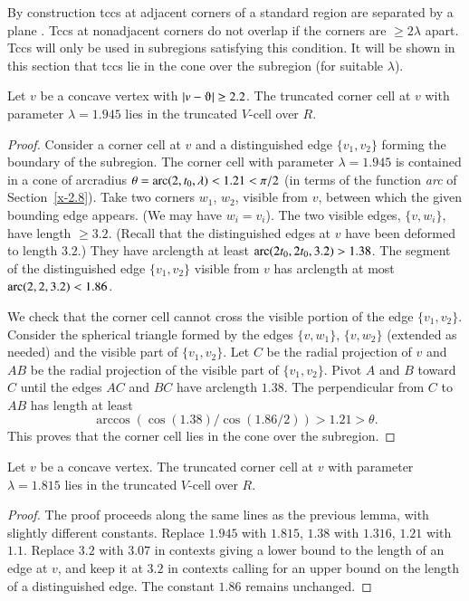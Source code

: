 By construction tccs at adjacent
corners of a standard region are separated by a plane . Tccs at
nonadjacent corners do not overlap if the corners are
$\ge2\lambda$ apart. Tccs will only be used in subregions
satisfying this condition. It will be shown in
this section that tccs lie in the cone over the subregion
(for suitable $\lambda$).

\begin{lemma}
Let $v$ be a concave vertex with $|v-\orgn|\ge2.2$. The truncated
corner cell at $v$ with parameter $\lambda=1.945$ lies in the truncated
$V$-cell over $R$.
\end{lemma}

\begin{proof}
Consider a  corner cell at $v$ and a distinguished edge $\{v_1,v_2\}$
forming the boundary of the subregion. The corner cell with parameter
$\lambda=1.945$ is contained in a cone of arcradius
    $\theta = \operatorname{arc}(2,t_0,\lambda)< 1.21 <\pi/2$
(in terms of the function {\it arc\/} of Section~\ref{x-2.8}). Take two
corners $w_1$, $w_2$, visible from $v$, between which the given bounding
edge appears. (We may have $w_i=v_i$). The two visible edges, $\{v,w_i\}$,
have length $\ge 3.2$. (Recall that the distinguished edges at $v$ have
been deformed to length $3.2$.) They have arclength at least
$\operatorname{arc}(2t_0,2t_0,3.2)>1.38$. The segment of the distinguished edge
$\{v_1,v_2\}$ visible from $v$ has arclength at most
$\operatorname{arc}(2,2,3.2)<1.86$.

We check that the corner cell cannot cross the visible portion of
the edge $\{v_1,v_2\}$. Consider the spherical triangle formed by
the edges $\{v,w_1\}$, $\{v,w_2\}$ (extended as needed) and the
visible part of $\{v_1,v_2\}$. Let $C$ be the radial projection of
$v$ and $AB$ be the radial projection of the visible part of
$\{v_1,v_2\}$. Pivot $A$ and $B$ toward $C$ until the edges $AC$ and
$BC$ have arclength $1.38$.  The perpendicular from $C$ to $AB$
has length at least
    $$\arccos(\cos(1.38)/\cos(1.86/2))>1.21>\theta.$$
This proves that the corner cell lies in the cone over the subregion.
\end{proof}

\begin{lemma}
Let $v$ be a concave vertex. The truncated corner cell at $v$ with
parameter $\lambda=1.815$ lies in the truncated $V$-cell over $R$.
\end{lemma}

\begin{proof}
The proof proceeds along the same lines as the previous lemma, with
slightly different constants. Replace $1.945$ with $1.815$, $1.38$ with
$1.316$, $1.21$ with $1.1$. Replace $3.2$ with $3.07$ in contexts giving
a lower bound to the length of an edge at $v$, and keep it at $3.2$ in
contexts calling for an upper bound on the length of a distinguished
edge. The constant $1.86$ remains unchanged.
\end{proof}

